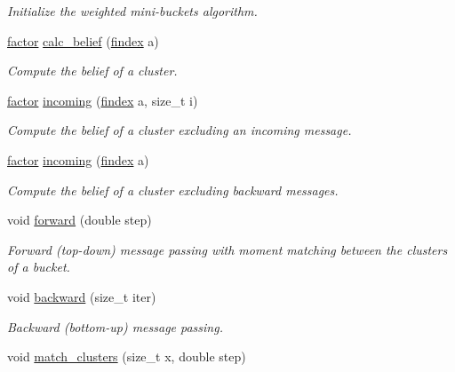 \begin{DoxyCompactItemize}
\begin{DoxyCompactList}\small\item\em Initialize the weighted mini-\/buckets algorithm. \end{DoxyCompactList}\item 
\hyperlink{classmerlin_1_1factor}{factor} \hyperlink{classmerlin_1_1wmb_a67bd322cf76dd18439123f244c8e95d9}{calc\+\_\+belief} (\hyperlink{classmerlin_1_1wmb_a5b845e1e9c8b169094995a385abb232a}{findex} a)
\begin{DoxyCompactList}\small\item\em Compute the belief of a cluster. \end{DoxyCompactList}\item 
\hyperlink{classmerlin_1_1factor}{factor} \hyperlink{classmerlin_1_1wmb_ad79e4290a7a13c13ba249d764704090a}{incoming} (\hyperlink{classmerlin_1_1wmb_a5b845e1e9c8b169094995a385abb232a}{findex} a, size\+\_\+t i)
\begin{DoxyCompactList}\small\item\em Compute the belief of a cluster excluding an incoming message. \end{DoxyCompactList}\item 
\hyperlink{classmerlin_1_1factor}{factor} \hyperlink{classmerlin_1_1wmb_af49cff26f827f40b710f06f9ebc6e01e}{incoming} (\hyperlink{classmerlin_1_1wmb_a5b845e1e9c8b169094995a385abb232a}{findex} a)
\begin{DoxyCompactList}\small\item\em Compute the belief of a cluster excluding backward messages. \end{DoxyCompactList}\item 
void \hyperlink{classmerlin_1_1wmb_ae0751c60569981427b9aea293e7ae6ba}{forward} (double step)\hypertarget{classmerlin_1_1wmb_ae0751c60569981427b9aea293e7ae6ba}{}\label{classmerlin_1_1wmb_ae0751c60569981427b9aea293e7ae6ba}

\begin{DoxyCompactList}\small\item\em Forward (top-\/down) message passing with moment matching between the clusters of a bucket. \end{DoxyCompactList}\item 
void \hyperlink{classmerlin_1_1wmb_af70144800198fa62226da1cc94b8a932}{backward} (size\+\_\+t iter)\hypertarget{classmerlin_1_1wmb_af70144800198fa62226da1cc94b8a932}{}\label{classmerlin_1_1wmb_af70144800198fa62226da1cc94b8a932}

\begin{DoxyCompactList}\small\item\em Backward (bottom-\/up) message passing. \end{DoxyCompactList}\item 
void \hyperlink{classmerlin_1_1wmb_a15f2962a5be2bff5c8778018c8dc785d}{match\+\_\+clusters} (size\+\_\+t x, double step)\hypertarget{classmerlin_1_1wmb_a15f2962a5be2bff5c8778018c8dc785d}{}\label{classmerlin_1_1wmb_a15f2962a5be2bff5c8778018c8dc785d}


\end{DoxyCompactItemize}

